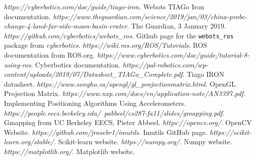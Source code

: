 \documentclass[a4paper]{article}
\begin{document}
	\newpage
	
	\begin{thebibliography}{19}
		\textit{https://cyberbotics.com/doc/guide/tiago-iron}. \newline
		Webots TIAGo Iron documentation.
		\textit{https://www.theguardian.com/science/2019/jan/03/china-probe-change-4-land-far-side-moon-basin-crater}. \newline
		The Guardian, 3 January 2019.
		\textit{https://github.com/cyberbotics/webots\_ros}. \newline
		Github page for the \texttt{webots\_ros} package from \textit{cyberbotics}.
		\textit{https://wiki.ros.org/ROS/Tutorials}. \newline
		ROS documentation from ROS.org.
		\textit{https://www.cyberbotics.com/doc/guide/tutorial-8-using-ros}. \newline
		Cyberbotics documentation.
		\textit{https://pal-robotics.com/wp-content/uploads/2019/07/Datasheet\_TIAGo\_Complete.pdf}. \newline
		Tiago IRON datasheet.
		\textit{https://www.songho.ca/opengl/gl\_projectionmatrix.html}. \newline
		OpenGL Projection Matrix.
		\textit{https://www.nxp.com/docs/en/application-note/AN3397.pdf}. \newline
		Implementing Positioning Algorithms Using Accelerometers.
		\textit{https://people.eecs.berkeley.edu/~pabbeel/cs287-fa11/slides/gmapping.pdf}. \newline
		Gmapping from UC Berkeley EECS, Pieter Abbeel.
		\textit{https://opencv.org/}. \newline
		OpenCV Website.
		\textit{https://github.com/jrosebr1/imutils}. \newline
		Imutils GitHub page.
		\textit{https://scikit-learn.org/stable/}. \newline
		Scikit-learn website.
		\textit{https://numpy.org/}. \newline
		Numpy website.
		\textit{https://matplotlib.org/}. \newline
		Matplotlib website.
	\end{thebibliography}
\end{document}
